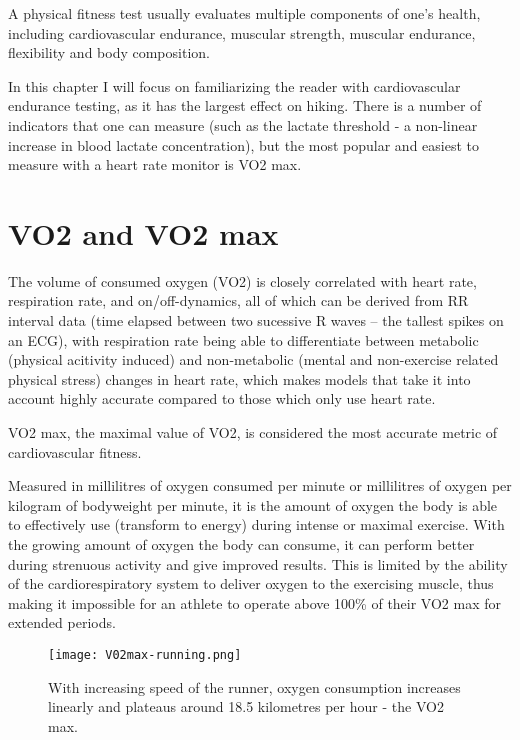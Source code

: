 A physical fitness test usually evaluates multiple components of one's health, including cardiovascular endurance, muscular strength, muscular endurance, flexibility and body composition.

In this chapter I will focus on familiarizing the reader with cardiovascular endurance testing, as it has the largest effect on hiking.
There is a number of indicators that one can measure (such as the lactate threshold - a non-linear increase in blood lactate concentration\cite{lactate-threshold}), 
but the most popular and easiest to measure with a heart rate monitor is VO2 max.

\section{VO2 and VO2 max}

The volume of consumed oxygen (VO2) is closely correlated with heart rate, respiration rate, and on/off-dynamics, all of which can be derived from RR interval data (time elapsed between two sucessive R waves -- the tallest spikes on an ECG),
with respiration rate being able to differentiate between metabolic (physical acitivity induced) and non-metabolic (mental and non-exercise related physical stress) changes in heart rate,
which makes models that take it into account highly accurate compared to those which only use heart rate.\cite{vo2-hr-firstbeat}

VO2 max, the maximal value of VO2, is considered the most accurate metric of cardiovascular fitness.

Measured in millilitres of oxygen consumed per minute or millilitres of oxygen per kilogram of bodyweight per minute, it is the amount of oxygen the body is able to effectively use (transform to energy) during intense or maximal exercise.
With the growing amount of oxygen the body can consume, it can perform better during strenuous activity and give improved results.\cite{vo2max-definition}
This is limited by the ability of the cardiorespiratory system to deliver oxygen to the exercising muscle, thus making it impossible for an athlete to operate above 100\% of their VO2 max for extended periods.\cite{vo2max-oxygen-delivery}

\begin{figure}[h]
    \texttt{[image: V02max-running.png]}
    \caption{With increasing speed of the runner, oxygen consumption increases linearly and plateaus around 18.5 kilometres per hour - the VO2 max. \cite{vo2max-speed-img}}
\end{figure}

